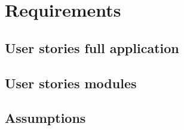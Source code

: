 \chapter{Requirements}

\section{User stories full application}

\section{User stories modules}

\section{Assumptions}